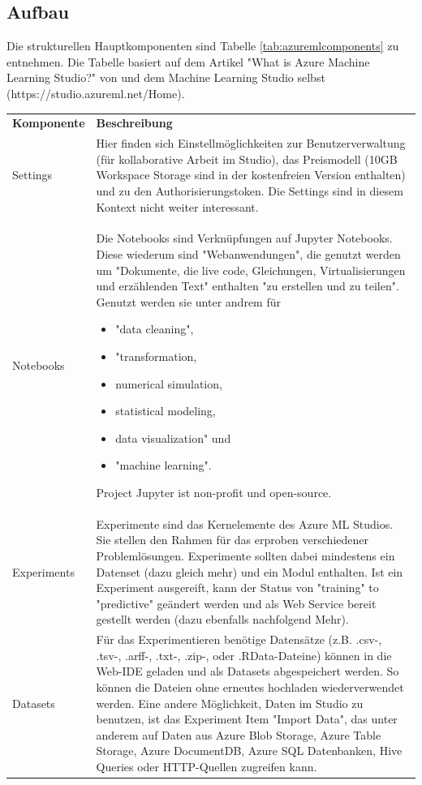 \subsection{Aufbau}
\newline
Die strukturellen Hauptkomponenten sind Tabelle \ref{tab:azuremlcomponents} zu entnehmen. Die Tabelle basiert auf dem Artikel "What is Azure Machine Learning Studio?" von \citep{ericson_what_2017} und dem Machine Learning Studio selbst (https://studio.azureml.net/Home).
\begin{longtable}[H]{|p{}|p{14cm}|}
\hline
\textbf{Komponente} & \textbf{Beschreibung}\\ 
\hhline{==}
Settings & Hier finden sich Einstellmöglichkeiten zur Benutzerverwaltung (für kollaborative Arbeit im Studio), das Preismodell (10GB Workspace Storage sind in der kostenfreien Version enthalten) und zu den Authorisierungstoken. Die Settings sind in diesem Kontext nicht weiter interessant. \\
\hline
Notebooks & Die Notebooks sind Verknüpfungen auf Jupyter Notebooks. Diese wiederum sind "Webanwendungen", die genutzt werden um "Dokumente, die live code, Gleichungen, Virtualisierungen und erzählenden Text" enthalten "zu erstellen und zu teilen". Genutzt werden sie unter andrem für 
\begin{itemize}
\item "data cleaning",
\item "transformation,
\item numerical simulation,
\item statistical modeling,
\item data visualization" und
\item "machine learning"\citep{noauthor_jupyter_2017}.
\end{itemize}
Project Jupyter ist non-profit und open-source.\citep{noauthor_about_2014} \\
\hline
Experiments & Experimente sind das Kernelemente des Azure ML Studios. Sie stellen den Rahmen für das erproben verschiedener Problemlösungen. Experimente sollten dabei mindestens ein Datenset (dazu gleich mehr) und ein Modul enthalten. Ist ein Experiment ausgereift, kann der Status von "training" to "predictive" geändert werden und als Web Service bereit gestellt werden (dazu ebenfalls nachfolgend Mehr).\\
\hline
Datasets & Für das Experimentieren benötige Datensätze (z.B. .csv-, .tsv-, .arff-, .txt-, .zip-, oder .RData-Dateine) können in die Web-IDE geladen und als Datasets abgespeichert werden. So können die Dateien ohne erneutes hochladen wiederverwendet werden. Eine andere Möglichkeit, Daten im Studio zu benutzen, ist das Experiment Item "Import Data", das unter anderem auf Daten aus Azure Blob Storage, Azure Table Storage, Azure DocumentDB, Azure SQL Datenbanken, Hive Queries oder HTTP-Quellen zugreifen kann.\\

\end{longtable}
